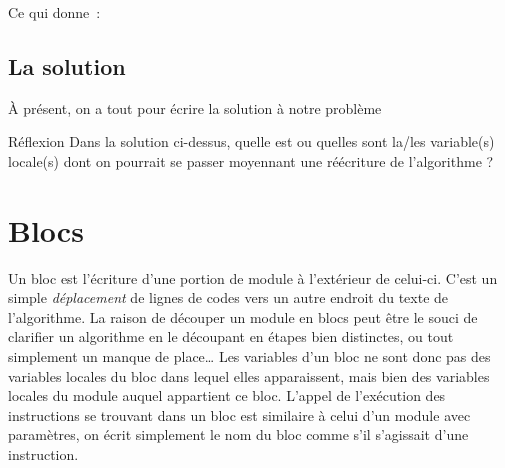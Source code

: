	Ce qui donne~:


\subsection{La solution}

	À présent, on a tout pour écrire la solution à notre problème


	
	\begin{Emphase}[reflexion]{Réflexion}
		Dans la solution ci-dessus, 
		quelle est ou quelles sont la/les variable(s) locale(s) 
		dont on pourrait se passer moyennant une réécriture de
		l'algorithme ?
	\end{Emphase}
	
\section{Blocs}

	{
	{Un bloc est l’écriture d’une portion de module
	à l’extérieur de celui-ci. C’est un simple
	}{\textit{déplacement}}{
	de lignes de codes vers un autre endroit du texte de
	l'algorithme. La raison de découper un module en blocs
	peut être le souci de clarifier un algorithme en le découpant en étapes
	bien distinctes, ou tout simplement un manque de place… Les variables
	d’un bloc ne sont donc pas des variables locales du bloc dans lequel
	elles apparaissent, mais bien des variables locales du module auquel
	appartient ce bloc. L’appel de l’exécution des instructions se trouvant
	dans un bloc est similaire à celui d’un module avec paramètres, on
	écrit simplement le nom du bloc comme s’il s’agissait d’une
	instruction.}}

